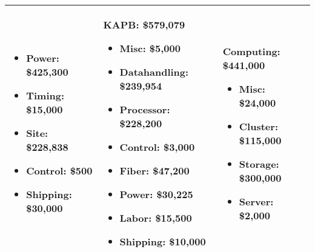 \begin{table}[t]
\begin{tabular}{| p{2in} | p{2in} | p{2in} | }
\begin{itemize}[parsep=-2pt, itemsep=-3pt]
\item Power:   \$425,300
\item Timing:   \$15,000
\item Site:   \$228,838
\item Control:   \$500
\item Shipping:   \$30,000
\end{itemize}
 &
 \noindent
\textbf{KAPB:}  \$579,079
\begin{itemize}[parsep=-2pt, itemsep=-3pt]
\item Misc:   \$5,000
\item Datahandling:   \$239,954
\item Processor:   \$228,200
\item Control:   \$3,000
\item Fiber:   \$47,200
\item Power:   \$30,225
\item Labor:   \$15,500
\item Shipping:   \$10,000
\end{itemize}
 &
 \noindent
\textbf{Computing:}  \$441,000
\begin{itemize}[parsep=-2pt, itemsep=-3pt]
\item Misc:   \$24,000
\item Cluster:   \$115,000
\item Storage:   \$300,000
\item Server:   \$2,000
\end{itemize}
\\ \hline
\end{tabular}
\end{table}
